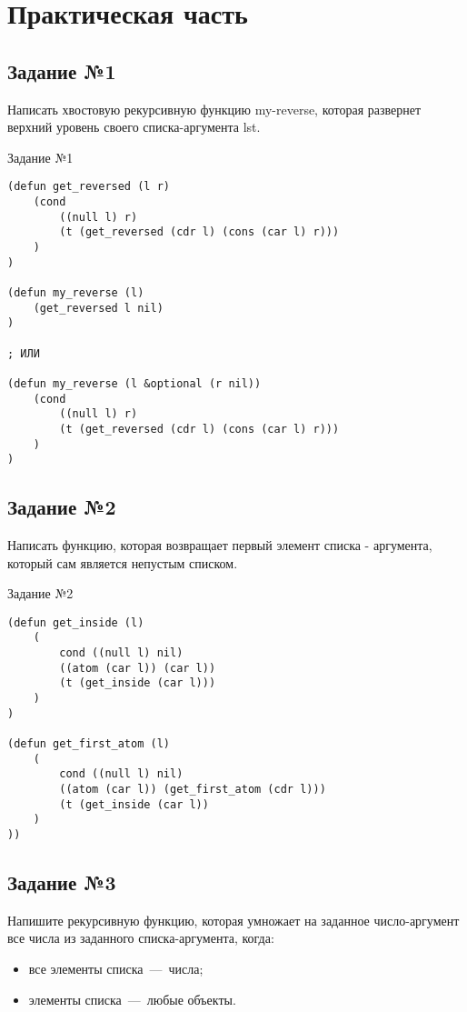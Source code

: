 \setcounter{page}{3}

\chapter{Практическая часть}
\section{Задание №1}
Написать хвостовую рекурсивную функцию my-reverse, которая развернет верхний уровень своего списка-аргумента lst.
  
\begin{code}
\caption{Задание №1}
\label{code:bf2}
\begin{verbatim}
(defun get_reversed (l r) 
	(cond
		((null l) r)
		(t (get_reversed (cdr l) (cons (car l) r)))  
	)
)

(defun my_reverse (l)
	(get_reversed l nil)
)

; ИЛИ

(defun my_reverse (l &optional (r nil)) 
	(cond
		((null l) r)
		(t (get_reversed (cdr l) (cons (car l) r)))  
	)
)
\end{verbatim}
\end{code}

\section{Задание №2}
Написать функцию, которая возвращает первый элемент списка - аргумента, который сам является непустым списком.

\begin{code}
\caption{Задание №2}
\label{code:bf2}
\begin{verbatim}
(defun get_inside (l)
	(
		cond ((null l) nil)
		((atom (car l)) (car l))
		(t (get_inside (car l)))
	)
)

(defun get_first_atom (l)
	(
		cond ((null l) nil)
		((atom (car l)) (get_first_atom (cdr l)))
		(t (get_inside (car l))
	)
))
\end{verbatim}
\end{code}

\section{Задание №3}
Напишите рекурсивную функцию, которая умножает на заданное число-аргумент все числа из заданного списка-аргумента, когда:
\begin{itemize}
	\item все элементы списка~---~числа;
	\item элементы списка~---~любые объекты.
\end{itemize}

